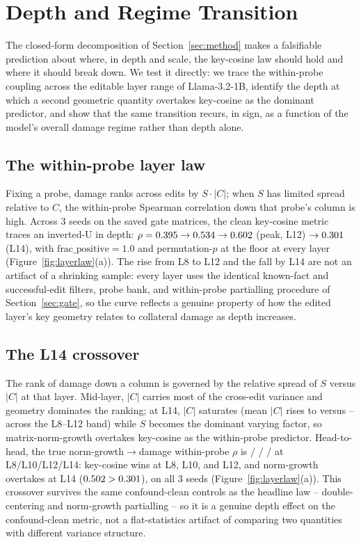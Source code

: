 \section{Depth and Regime Transition}
\label{sec:regime}

The closed-form decomposition of Section~\ref{sec:method} makes a
falsifiable prediction about where, in depth and scale, the key-cosine law
should hold and where it should break down. We test it directly: we trace the
within-probe coupling across the editable layer range of Llama-3.2-1B,
identify the depth at which a second geometric quantity overtakes key-cosine
as the dominant predictor, and show that the same transition recurs, in sign,
as a function of the model's overall damage regime rather than depth alone.

\subsection{The within-probe layer law}
Fixing a probe, damage ranks across edits by $S\cdot|C|$; when $S$ has
limited spread relative to $C$, the within-probe Spearman correlation down
that probe's column is high. Across 3 seeds on the saved gate matrices, the
clean key-cosine metric traces an inverted-U in depth: $\rho =
0.395{}\rightarrow0.534{}\rightarrow0.602{}$
(peak, L12) $\rightarrow0.301{}$ (L14), with
$\text{frac\_positive}=1.0$ and permutation-$p$ at the \gPermFloor{} floor at
every layer (Figure~\ref{fig:layerlaw}(a)). The rise from L8 to L12 and the
fall by L14 are not an artifact of a shrinking sample: every layer uses the
identical known-fact and successful-edit filters, probe bank, and within-probe
partialling procedure of Section~\ref{sec:gate}, so the curve reflects a
genuine property of how the edited layer's key geometry relates to collateral
damage as depth increases.

\subsection{The L14 crossover}
The rank of damage down a column is governed by the relative spread of $S$
versus $|C|$ at that layer. Mid-layer, $|C|$ carries most of the cross-edit
variance and geometry dominates the ranking; at L14, $|C|$ saturates (mean
$|C|$ rises to \meanCLfourteen{} versus \meanCbandLo{}--\meanCbandHi{}
across the L8--L12 band) while $S$ becomes the dominant varying factor, so
matrix-norm-growth overtakes key-cosine as the within-probe predictor.
Head-to-head, the true norm-growth$\rightarrow$damage within-probe $\rho$ is
\ngWithinLeight{} / \ngWithinLten{} / \ngWithinLtwelve{} /
\ngWithinLfourteen{} at L8/L10/L12/L14: key-cosine wins at L8, L10, and L12,
and norm-growth overtakes at L14
($0.502{} > 0.301{}$), on all 3 seeds
(Figure~\ref{fig:layerlaw}(a)). This crossover survives the same
confound-clean controls as the headline law -- double-centering and
norm-growth partialling -- so it is a genuine depth effect on the
confound-clean metric, not a flat-statistics artifact of comparing two
quantities with different variance structure.

